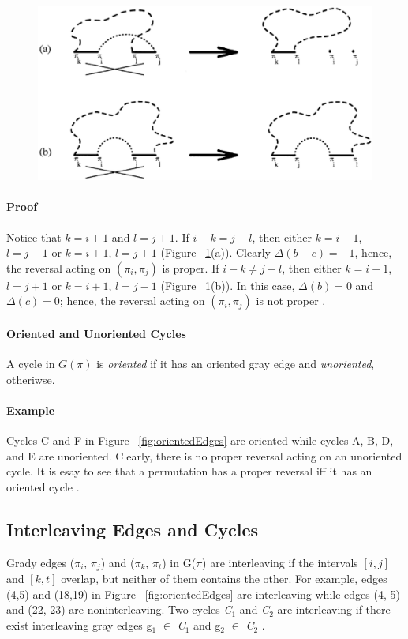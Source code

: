\documentclass[10pt]{article}
\begin{document}
\begin{figure}[here]
\includegraphics[scale=0.6]{resources/figure_3.eps}
\caption{\cite{Hannenhalli95transformingcabbage}}
\label{fig:figure3}
\end{figure}

\paragraph{Proof} Notice that $k = i \pm 1$ and $l = j \pm 1$. If $i - k = j -
l$, then either $k = i - 1$, $l = j - 1$ or $k = i + 1$, $l = j + 1$ (Figure
~\ref{fig:figure3}(a)). Clearly $\Delta(b - c) = -1$, hence, the reversal acting
on $(\pi_i, \pi_j)$ is proper. If $i - k \neq j - l$, then either $k = i - 1$,
$l = j + 1$ or $k = i + 1$, $l = j - 1$ (Figure ~\ref{fig:figure3}(b)). In this
case, $\Delta(b) = 0$ and $\Delta(c) = 0$; hence, the reversal acting on
$(\pi_i, \pi_j)$ is not proper \cite{Hannenhalli95transformingcabbage}.

\paragraph{Oriented and Unoriented Cycles} A cycle in $G(\pi)$ is
\textit{oriented} if it has an oriented gray edge and \emph{unoriented},
otheriwse. 

\paragraph{Example} Cycles C and F in Figure ~\ref{fig:orientedEdges} are
oriented while cycles A, B, D, and E are unoriented. Clearly, there is no
proper reversal acting on an unoriented cycle. It is esay to see that a
permutation has a proper reversal iff it has an oriented cycle
\cite{Hannenhalli95transformingcabbage}.

\subsection*{Interleaving Edges and Cycles}
Grady edges ($\pi$$_{i}$, $\pi$$_{j}$) and ($\pi$$_{k}$, $\pi$$_{t}$) in
G($\pi$) are interleaving if the intervals $[i, j]$ and $[k, t]$ overlap, but
neither of them contains the other. For example, edges (4,5) and (18,19) in
Figure ~\ref{fig:orientedEdges} are interleaving while edges (4, 5) and (22,
23) are noninterleaving. Two cycles \emph{C$_{1}$} and \emph{C$_{2}$} are
interleaving if there exist interleaving gray edges g$_{1}$ $\in$
\emph{C$_{1}$} and g$_{2}$ $\in$ \emph{C$_{2}$}
\cite{Hannenhalli95transformingcabbage}.
\end{document}
